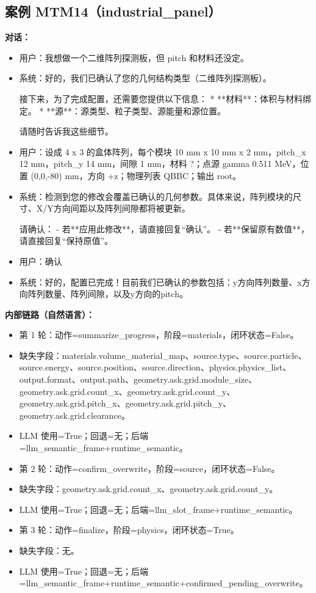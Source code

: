\documentclass[11pt]{ctexart}
\begin{document}
\subsection{案例 MTM14（industrial\_panel）}
\textbf{对话：}
\begin{itemize}
\item 用户：我想做一个二维阵列探测板，但 pitch 和材料还没定。
\item 系统：好的，我们已确认了您的几何结构类型（二维阵列探测板）。

接下来，为了完成配置，还需要您提供以下信息：
*   **材料**：体积与材料绑定。
*   **源**：源类型、粒子类型、源能量和源位置。

请随时告诉我这些细节。
\item 用户：设成 4 x 3 的盒体阵列，每个模块 10 mm x 10 mm x 2 mm，pitch\_x 12 mm，pitch\_y 14 mm，间隙 1 mm，材料 ?；点源 gamma 0.511 MeV，位置 (0,0,-80) mm，方向 +z；物理列表 QBBC；输出 root。
\item 系统：检测到您的修改会覆盖已确认的几何参数。具体来说，阵列模块的尺寸、X/Y方向间距以及阵列间隙都将被更新。

请确认：
- 若**应用此修改**，请直接回复“确认”。
- 若**保留原有数值**，请直接回复“保持原值”。
\item 用户：确认
\item 系统：好的，配置已完成！目前我们已确认的参数包括：y方向阵列数量、x方向阵列数量、阵列间隙，以及y方向的pitch。
\end{itemize}
\textbf{内部链路（自然语言）：}
\begin{itemize}
\item 第 1 轮：动作=summarize\_progress，阶段=materials，闭环状态=False。
\item 缺失字段：materials.volume\_material\_map、source.type、source.particle、source.energy、source.position、source.direction、physics.physics\_list、output.format、output.path、geometry.ask.grid.module\_size、geometry.ask.grid.count\_x、geometry.ask.grid.count\_y、geometry.ask.grid.pitch\_x、geometry.ask.grid.pitch\_y、geometry.ask.grid.clearance。
\item LLM 使用=True；回退=无；后端=llm\_semantic\_frame+runtime\_semantic。
\item 第 2 轮：动作=confirm\_overwrite，阶段=source，闭环状态=False。
\item 缺失字段：geometry.ask.grid.count\_x、geometry.ask.grid.count\_y。
\item LLM 使用=True；回退=无；后端=llm\_slot\_frame+runtime\_semantic。
\item 第 3 轮：动作=finalize，阶段=physics，闭环状态=True。
\item 缺失字段：无。
\item LLM 使用=True；回退=无；后端=llm\_semantic\_frame+runtime\_semantic+confirmed\_pending\_overwrite。
\end{itemize}
\end{document}
